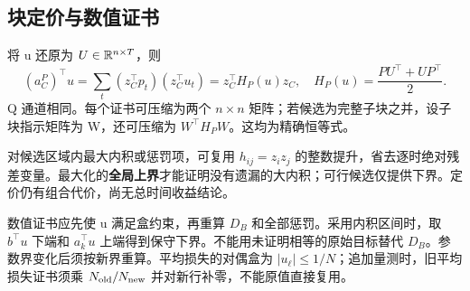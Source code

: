 \subsection{块定价与数值证书}
将 u 还原为 $U\in\mathbb R^{n\times T}$，则
\begin{equation}
 (a_C^P)^\top u=\sum_t(z_C^\top p_t)(z_C^\top u_t)
 =z_C^\top H_P(u)z_C,\quad
 H_P(u)=\frac{PU^\top+UP^\top}{2}.
 \label{eq:quadratic}
\end{equation}
Q 通道相同。每个证书可压缩为两个 $n\times n$ 矩阵；若候选为完整子块之并，设子块指示矩阵为 W，还可压缩为 $W^\top H_PW$。这均为精确恒等式。

对候选区域内最大内积或惩罚项，可复用 $h_{ij}=z_i z_j$ 的整数提升，省去逐时绝对残差变量。最大化的\textbf{全局上界}才能证明没有遗漏的大内积；可行候选仅提供下界。定价仍有组合代价，尚无总时间收益结论。

数值证书应先使 u 满足盒约束，再重算 $D_B$ 和全部惩罚。采用内积区间时，取 $b^\top u$ 下端和 $a_k^\top u$ 上端得到保守下界。不能用未证明相等的原始目标替代 $D_B$。参数界变化后须按新界重算。平均损失的对偶盒为 $|u_\ell|\le1/N$；追加量测时，旧平均损失证书须乘 $N_{\rm old}/N_{\rm new}$ 并对新行补零，不能原值直接复用。
